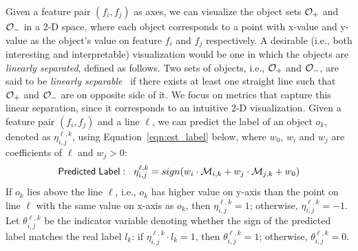 Given a feature pair $(f_i,f_j)$ as axes, we can visualize the object sets ${\mathcal{O}}_+$ and ${\mathcal{O}}_-$ in a 2-D space, where each object corresponds to a point with x-value and y-value as the object's value on feature $f_i$ and $f_j$ respectively. A desirable (i.e., both interesting and interpretable) visualization would be one in which the objects are {\em linearly separated}, defined as follows. Two sets of objects, i.e., ${\mathcal{O}}_+$ and ${\mathcal{O}}_-$, are said to be \emph{linearly separable}~\cite{medin1981linear} if there exists at least one straight line such that ${\mathcal{O}}_+$ and ${\mathcal{O}}_-$ are on opposite side of it.
We focus on metrics that capture this linear separation, since it corresponds to an intuitive 2-D visualization.
Given a feature pair $(f_i,f_j)$ and a line $\ell$, we can predict the label of an object $o_k$, denoted as $\eta_{i,j}^{\ell,k}$, using Equation~\ref{eqn:est_label} below, where $w_0$, $w_i$ and $w_j$ are coefficients of $\ell$ and $w_j>0$:
\begin{equation}\label{eqn:est_label}
{\sf Predicted \hspace{1mm} Label:}\hspace{3mm} \eta_{i,j}^{\ell,k}=sign(w_i\cdot {\mathcal{M}}_{i,k} + w_j\cdot {\mathcal{M}}_{j,k} +w_0)
\end{equation}
\noindent If $o_k$ lies above the line $\ell$, i.e., $o_k$ has higher value on y-axis than the point on line $\ell$ with the same value on x-axis as $o_k$, then $\eta_{i,j}^{\ell,k}=1$; otherwise, $\eta_{i,j}^{\ell,k}=-1$. Let $\theta_{i,j}^{\ell,k}$ be the indicator variable denoting whether  the sign of the predicted label matches the real label $l_k$\eat{)}: if $\eta_{i,j}^{\ell,k}\cdot l_k = 1$, then $\theta_{i,j}^{\ell,k} = 1$; otherwise, $\theta_{i,j}^{\ell,k} = 0$.
